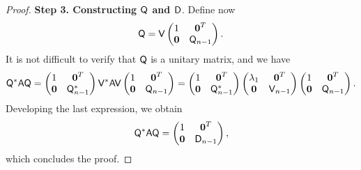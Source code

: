 \begin{proof}
            \vspace{.3cm}
            \textbf{Step 3. Constructing $\mathsf Q$ and $\mathsf D$}.
            Define now
            \[
                \mathsf Q =
                \mathsf V
                \begin{pmatrix}
                    1 & \mathbf{\boldsymbol{0}}^T \\
                    \mathbf{\boldsymbol{0}} & \mathsf Q_{n-1}
                \end{pmatrix}.
            \]
            It is not difficult to verify that $\mathsf Q$ is a unitary matrix,
            and we have
            \[
                \mathsf Q^* \mathsf A \mathsf Q =
                \begin{pmatrix}
                    1 & \mathbf{\boldsymbol{0}}^T \\
                    \mathbf{\boldsymbol{0}} & \mathsf Q_{n-1}^*
                \end{pmatrix}
                \mathsf V^* \mathsf A \mathsf V
                \begin{pmatrix}
                    1 & \mathbf{\boldsymbol{0}}^T \\
                    \mathbf{\boldsymbol{0}} & \mathsf Q_{n-1}
                \end{pmatrix}
                =
                \begin{pmatrix}
                    1 & \mathbf{\boldsymbol{0}}^T \\
                    \mathbf{\boldsymbol{0}} & \mathsf Q_{n-1}^*
                \end{pmatrix}
                \begin{pmatrix}
                    \lambda_1 & \mathbf{\boldsymbol{0}}^T \\
                    \mathbf{\boldsymbol{0}} & \mathsf V_{n-1}
                \end{pmatrix}
                \begin{pmatrix}
                    1 & \mathbf{\boldsymbol{0}}^T \\
                    \mathbf{\boldsymbol{0}} & \mathsf Q_{n-1}
                \end{pmatrix}.
            \]
            Developing the last expression, we obtain
            \[
                \mathsf Q^* \mathsf A \mathsf Q
                =
                \begin{pmatrix}
                    1 & \mathbf{\boldsymbol{0}}^T \\
                    \mathbf{\boldsymbol{0}} & \mathsf D_{n-1}
                \end{pmatrix},
            \]
            which concludes the proof.
\end{proof}

